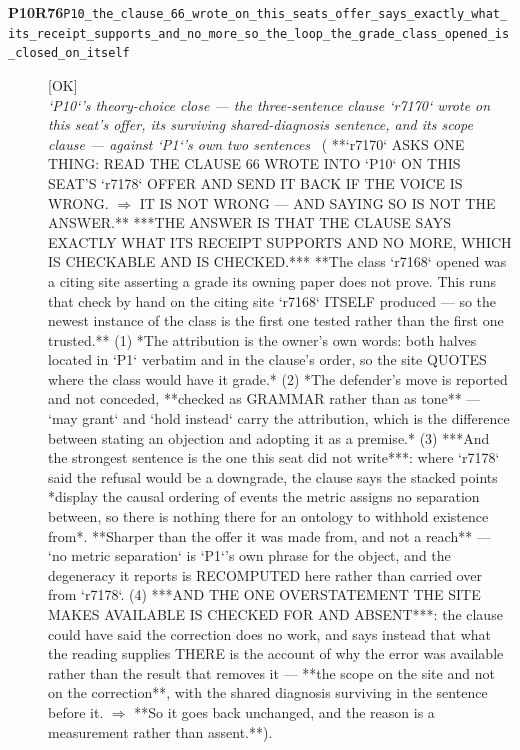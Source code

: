 \begin{description}
\item[\textbf{P10R76}\quad\texttt{P10\_the\_clause\_66\_wrote\_on\_this\_seats\_offer\_says\_exactly\_what\_its\_receipt\_supports\_and\_no\_more\_so\_the\_loop\_the\_grade\_class\_opened\_is\_closed\_on\_itself}]\hfill\textsf{[OK]}\\
\textit{`P10`'s theory-choice close --- the three-sentence clause `r7170` wrote on this seat's offer, its surviving shared-diagnosis sentence, and its scope clause --- against `P1`'s own two sentences} \ ( **`r7170` ASKS ONE THING: READ THE CLAUSE 66 WROTE INTO `P10` ON THIS SEAT'S `r7178` OFFER AND SEND IT BACK IF THE VOICE IS WRONG. \ensuremath{\Rightarrow} IT IS NOT WRONG --- AND SAYING SO IS NOT THE ANSWER.** ***THE ANSWER IS THAT THE CLAUSE SAYS EXACTLY WHAT ITS RECEIPT SUPPORTS AND NO MORE, WHICH IS CHECKABLE AND IS CHECKED.***  **The class `r7168` opened was a citing site asserting a grade its owning paper does not prove. This runs that check by hand on the citing site `r7168` ITSELF produced --- so the newest instance of the class is the first one tested rather than the first one trusted.** (1) *The attribution is the owner's own words: both halves located in `P1` verbatim and in the clause's order, so the site QUOTES where the class would have it grade.* (2) *The defender's move is reported and not conceded, **checked as GRAMMAR rather than as tone** --- `may grant` and `hold instead` carry the attribution, which is the difference between stating an objection and adopting it as a premise.* (3) ***And the strongest sentence is the one this seat did not write***: where `r7178` said the refusal would be a downgrade, the clause says the stacked points *display the causal ordering of events the metric assigns no separation between, so there is nothing there for an ontology to withhold existence from*. **Sharper than the offer it was made from, and not a reach** --- `no metric separation` is `P1`'s own phrase for the object, and the degeneracy it reports is RECOMPUTED here rather than carried over from `r7178`. (4) ***AND THE ONE OVERSTATEMENT THE SITE MAKES AVAILABLE IS CHECKED FOR AND ABSENT***: the clause could have said the correction does no work, and says instead that what the reading supplies THERE is the account of why the error was available rather than the result that removes it --- **the scope on the site and not on the correction**, with the shared diagnosis surviving in the sentence before it. \ensuremath{\Rightarrow} **So it goes back unchanged, and the reason is a measurement rather than assent.**). 

\end{description}
